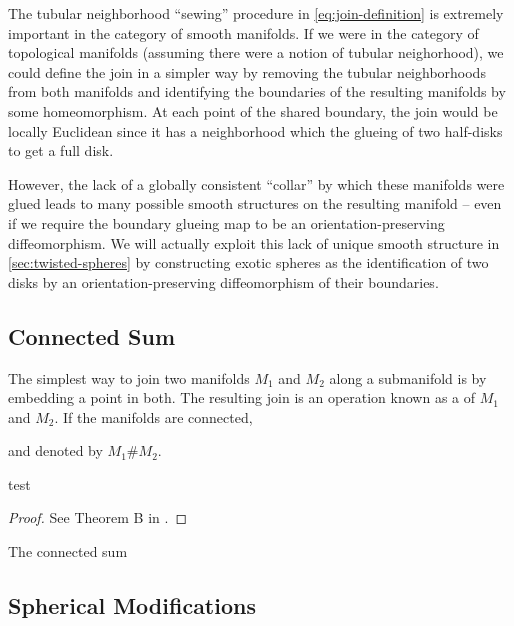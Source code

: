 \begin{remark}
	The tubular neighborhood ``sewing'' procedure in \cref{eq:join-definition} is extremely important in the category of smooth manifolds. If we were in the category of topological manifolds (assuming there were a notion of tubular neighorhood), we could define the join in a simpler way by removing the tubular neighborhoods from both manifolds and identifying the boundaries of the resulting manifolds by some homeomorphism. At each point of the shared boundary, the join would be locally Euclidean since it has a neighborhood which the glueing of two half-disks to get a full disk.

	However, the lack of a globally consistent ``collar'' by which these manifolds were glued leads to many possible smooth structures on the resulting manifold -- even if we require the boundary glueing map to be an orientation-preserving diffeomorphism. We will actually exploit this lack of unique smooth structure in \cref{sec:twisted-spheres} by constructing exotic spheres as the identification of two disks by an orientation-preserving diffeomorphism of their boundaries.
\end{remark}

\subsection{Connected Sum}\label{sec:connected-sum}

The simplest way to join two manifolds $M_1$ and $M_2$ along a submanifold is by embedding a point in both. The resulting join is an operation known as a  of $M_1$ and $M_2$. If the manifolds are connected,

and denoted by $M_1\# M_2$.

\begin{theorem}
	test
\end{theorem}
\begin{proof}
	See Theorem B in \cite{palais1960diffeomorphism}.
\end{proof}

\begin{proposition}\label{prop:connected-sum-operation}
	The connected sum
\end{proposition}

\subsection{Spherical Modifications}


